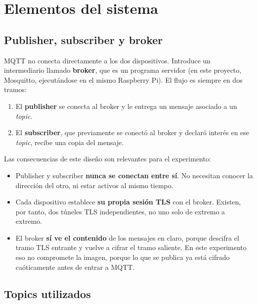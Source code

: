 \documentclass[12pt,a4paper]{article}
\begin{document}
\section{Elementos del sistema}

\subsection{Publisher, subscriber y broker}

MQTT no conecta directamente a los dos dispositivos. Introduce un intermediario llamado \textbf{broker}, que es un programa servidor (en este proyecto, Mosquitto, ejecutándose en el mismo Raspberry Pi). El flujo es siempre en dos tramos:

\begin{enumerate}[leftmargin=1.4cm]
	\item El \textbf{publisher} se conecta al broker y le entrega un mensaje asociado a un \textit{topic}.
	\item El \textbf{subscriber}, que previamente se conectó al broker y declaró interés en ese \textit{topic}, recibe una copia del mensaje.
\end{enumerate}

Las consecuencias de este diseño son relevantes para el experimento:

\begin{itemize}[leftmargin=1.4cm]
	\item Publisher y subscriber \textbf{nunca se conectan entre sí}. No necesitan conocer la dirección del otro, ni estar activos al mismo tiempo.
	\item Cada dispositivo establece \textbf{su propia sesión TLS} con el broker. Existen, por tanto, dos túneles TLS independientes, no uno solo de extremo a extremo.
	\item El broker \textbf{sí ve el contenido} de los mensajes en claro, porque descifra el tramo TLS entrante y vuelve a cifrar el tramo saliente. En este experimento eso no compromete la imagen, porque lo que se publica ya está cifrado caóticamente antes de entrar a MQTT.
\end{itemize}

\subsection{Topics utilizados}
\end{document}
